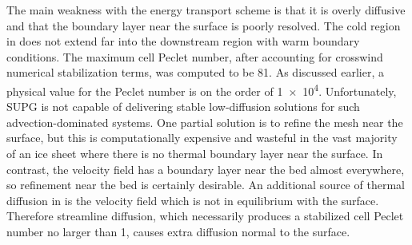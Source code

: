 The main weakness with the energy transport scheme is that it is overly diffusive and that the boundary layer near the surface is poorly resolved.
The cold region in  does not extend far into the downstream region with warm boundary conditions.
The maximum cell Peclet number, after accounting for crosswind numerical stabilization terms, was computed to be 81.
As discussed earlier, a physical value for the Peclet number is on the order of \num{1e4}.
Unfortunately, SUPG is not capable of delivering stable low-diffusion solutions for such advection-dominated systems.
One partial solution is to refine the mesh near the surface, but this is computationally expensive and wasteful in the vast majority of an ice sheet where there is no thermal boundary layer near the surface.
In contrast, the velocity field has a boundary layer near the bed almost everywhere, so refinement near the bed is certainly desirable.
An additional source of thermal diffusion in  is the velocity field which is not in equilibrium with the surface.
Therefore streamline diffusion, which necessarily produces a stabilized cell Peclet number no larger than 1, causes extra diffusion normal to the surface.
